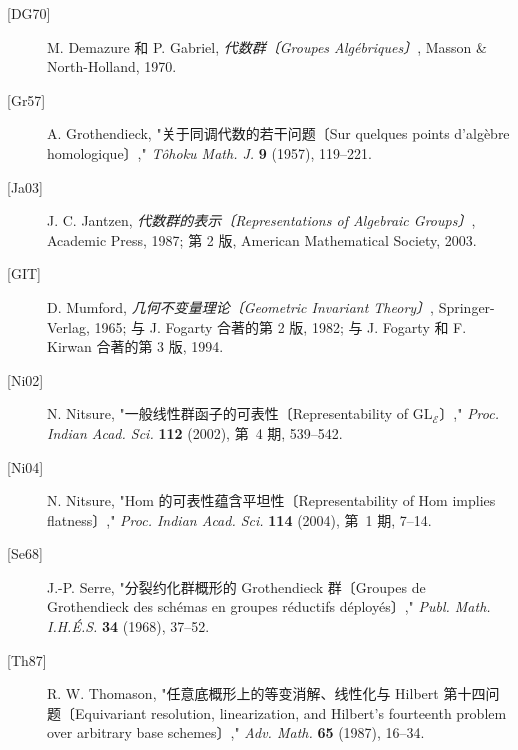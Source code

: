 \begin{description}
\item[{[DG70]}] M. Demazure 和 P. Gabriel,
  \emph{代数群〔Groupes Alg\'ebriques〕}, Masson \& North-Holland, 1970.
\item[{[Gr57]}] A. Grothendieck,
  "关于同调代数的若干问题〔Sur quelques points d'alg\`ebre homologique〕,"
  \emph{T\^ohoku Math. J.} \textbf{9} (1957), 119--221.
\item[{[Ja03]}] J. C. Jantzen,
  \emph{代数群的表示〔Representations of Algebraic Groups〕}, Academic Press, 1987;
  第 2 版, American Mathematical Society, 2003.
\item[{[GIT]}] D. Mumford,
  \emph{几何不变量理论〔Geometric Invariant Theory〕}, Springer-Verlag, 1965;
  与 J. Fogarty 合著的第 2 版, 1982; 与 J. Fogarty
  和 F. Kirwan 合著的第 3 版, 1994.
\item[{[Ni02]}] N. Nitsure,
  "一般线性群函子的可表性〔Representability of \(\mathrm{GL}_{\mathcal E}\)〕,"
  \emph{Proc. Indian Acad. Sci.} \textbf{112} (2002), 第~4 期, 539--542.
\item[{[Ni04]}] N. Nitsure,
  "Hom 的可表性蕴含平坦性〔Representability of Hom implies flatness〕,"
  \emph{Proc. Indian Acad. Sci.} \textbf{114} (2004), 第~1 期, 7--14.
\item[{[Se68]}] J.-P. Serre,
  "分裂约化群概形的 Grothendieck 群〔Groupes de Grothendieck des sch\'emas en groupes r\'eductifs
  d\'eploy\'es〕,"
  \emph{Publ. Math. I.H.\'E.S.} \textbf{34} (1968), 37--52.
\item[{[Th87]}] R. W. Thomason,
  "任意底概形上的等变消解、线性化与 Hilbert 第十四问题〔Equivariant resolution, linearization, and Hilbert's fourteenth
  problem over arbitrary base schemes〕,"
  \emph{Adv. Math.} \textbf{65} (1987), 16--34.
\end{description}




